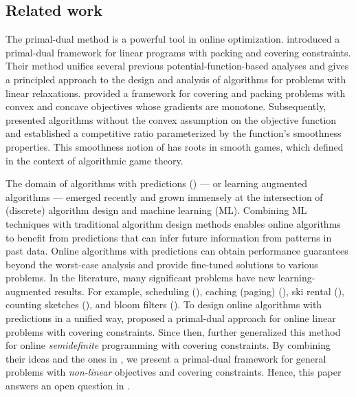 \subsection{Related work}
The primal-dual method is a powerful tool in online optimization. \cite{BuchbinderNaor09:The-Design-of-Competitive} introduced a primal-dual framework for linear programs with packing and covering constraints. Their method unifies several previous potential-function-based analyses and gives a principled approach to the design and analysis of algorithms for problems with linear relaxations. \cite{AzarBuchbinder16:Online-Algorithms} provided a framework for covering and packing problems with convex and concave objectives whose gradients are monotone. Subsequently, \cite{Thang20:Online-Primal-Dual} presented algorithms without the convex assumption on the objective function and established a competitive ratio parameterized by the function's smoothness properties. This smoothness notion of \cite{Thang20:Online-Primal-Dual} has roots in smooth games, which \cite{Roughgarden15:Intrinsic-Robustness} defined in the context of algorithmic game theory.

The domain of algorithms with predictions (\cite{MitzenmacherVassilvitskii20:Beyond-the-Worst-Case}) --- or learning augmented algorithms --- emerged recently and grown immensely at the intersection of (discrete) algorithm design and machine learning (ML).
Combining ML techniques with traditional algorithm design methods enables online algorithms to benefit from predictions that can infer future information from patterns in past data. Online algorithms with predictions can obtain performance guarantees beyond the worst-case analysis and provide fine-tuned solutions to various problems. In the literature, many significant problems have new learning-augmented results. For example, scheduling (\cite{LattanziLavastida20:Online-scheduling,Mitzenmacher20:Scheduling-with}), caching (paging) (\cite{LykourisVassilvtiskii18:Competitive-caching,Rohatgi20:Near-optimal-bounds,AntoniadisCoester20:Online-metric}), ski rental (\cite{GollapudiPanigrahi19:Online-algorithms,KumarPurohit18:Improving-online}), counting sketches (\cite{HsuIndyk19:Learning-Based-Frequency}), and bloom filters (\cite{KraskaBeutel18:The-case-for-learned,Mitzenmacher18:A-model-for-learned}).
To design online algorithms with predictions in a unified way, \cite{BamasMaggiori20:The-Primal-Dual-method} proposed a primal-dual approach for online linear problems with covering constraints. Since then, \cite{GrigorescuLin22:Learning-Augmented-Algorithms} further generalized this method for online \emph{semidefinite} programming with covering constraints. By combining their ideas and the ones in \cite{BuchbinderNaor09:The-Design-of-Competitive,AzarBuchbinder16:Online-Algorithms,Thang20:Online-Primal-Dual}, we present a primal-dual framework for general problems with \emph{non-linear} objectives and covering constraints. Hence, this paper answers an open question in \cite{BamasMaggiori20:The-Primal-Dual-method}.


